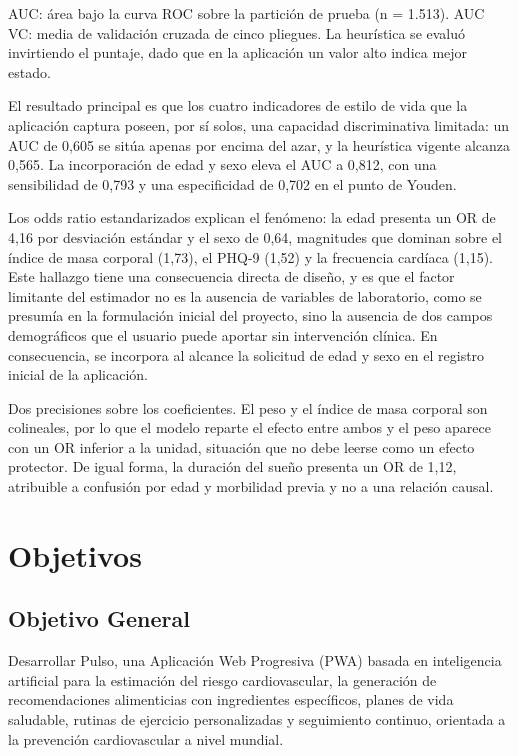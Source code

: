 \documentclass[12pt,letterpaper]{article}
\begin{document}
\vspace{0.2cm}
\noindent\footnotesize AUC: área bajo la curva ROC sobre la partición de prueba
(n = 1.513). AUC VC: media de validación cruzada de cinco pliegues. La heurística
se evaluó invirtiendo el puntaje, dado que en la aplicación un valor alto indica
mejor estado.\normalsize

\vspace{0.4cm}

El resultado principal es que los cuatro indicadores de estilo de vida que la
aplicación captura poseen, por sí solos, una capacidad discriminativa limitada:
un AUC de 0,605 se sitúa apenas por encima del azar, y la heurística vigente
alcanza 0,565. La incorporación de edad y sexo eleva el AUC a 0,812, con una
sensibilidad de 0,793 y una especificidad de 0,702 en el punto de Youden.

Los odds ratio estandarizados explican el fenómeno: la edad presenta un OR de
4,16 por desviación estándar y el sexo de 0,64, magnitudes que dominan sobre el
índice de masa corporal (1,73), el PHQ-9 (1,52) y la frecuencia cardíaca (1,15).
Este hallazgo tiene una consecuencia directa de diseño, y es que el factor
limitante del estimador no es la ausencia de variables de laboratorio, como se
presumía en la formulación inicial del proyecto, sino la ausencia de dos campos
demográficos que el usuario puede aportar sin intervención clínica. En
consecuencia, se incorpora al alcance la solicitud de edad y sexo en el registro
inicial de la aplicación.

Dos precisiones sobre los coeficientes. El peso y el índice de masa corporal son
colineales, por lo que el modelo reparte el efecto entre ambos y el peso aparece
con un OR inferior a la unidad, situación que no debe leerse como un efecto
protector. De igual forma, la duración del sueño presenta un OR de 1,12, atribuible
a confusión por edad y morbilidad previa y no a una relación causal.

\newpage

\section{Objetivos}

\subsection{Objetivo General}

Desarrollar Pulso, una Aplicación Web Progresiva (PWA) basada en inteligencia
artificial para la estimación del riesgo cardiovascular, la generación de
recomendaciones alimenticias con ingredientes específicos, planes de vida
saludable, rutinas de ejercicio personalizadas y seguimiento continuo, orientada
a la prevención cardiovascular a nivel mundial.
\end{document}
